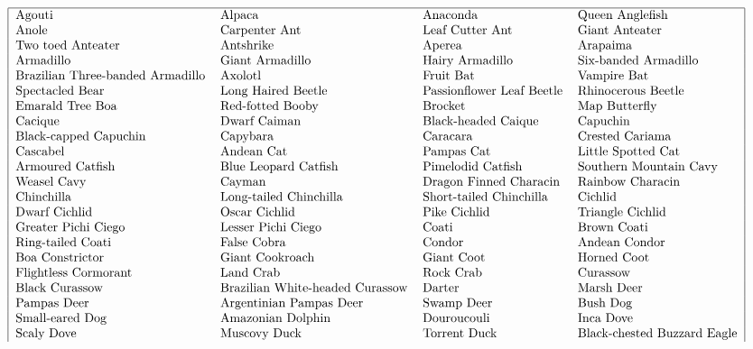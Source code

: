
\tiny
\[\begin{tabular}{|llll|}
\hline
Agouti   & Alpaca   & Anaconda  & Queen Anglefish  \\
Anole   & Carpenter Ant  & Leaf Cutter Ant   & Giant Anteater  \\
Two toed Anteater  & Antshrike   & Aperea   & Arapaima \\
Armadillo   & Giant Armadillo   & Hairy Armadillo  & Six-banded Armadillo  \\
Brazilian Three-banded Armadillo   & Axolotl  & Fruit Bat   & Vampire Bat  \\
Spectacled Bear  & Long Haired Beetle   & Passionflower Leaf Beetle   & Rhinocerous Beetle \\
Emarald Tree Boa   & Red-fotted Booby   & Brocket  & Map Butterfly  \\
Cacique   & Dwarf Caiman  & Black-headed Caique   & Capuchin  \\
Black-capped Capuchin  & Capybara   & Caracara   & Crested Cariama \\
Cascabel   & Andean Cat   & Pampas Cat  & Little Spotted Cat  \\
Armoured Catfish   & Blue Leopard Catfish  & Pimelodid Catfish   & Southern Mountain Cavy  \\
Weasel Cavy  & Cayman   & Dragon Finned Characin   & Rainbow Characin \\
Chinchilla   & Long-tailed Chinchilla   & Short-tailed Chinchilla  & Cichlid  \\
Dwarf Cichlid   & Oscar Cichlid  & Pike Cichlid   & Triangle Cichlid  \\
Greater Pichi Ciego  & Lesser Pichi Ciego   & Coati   & Brown Coati \\
Ring-tailed Coati   & False Cobra   & Condor  & Andean Condor  \\
Boa Constrictor   & Giant Cookroach  & Giant Coot   & Horned Coot  \\
Flightless Cormorant  & Land Crab   & Rock Crab   & Curassow \\
Black Curassow   & Brazilian White-headed Curassow   & Darter  & Marsh Deer  \\
Pampas Deer   & Argentinian Pampas Deer  & Swamp Deer   & Bush Dog  \\
Small-eared Dog  & Amazonian Dolphin   & Douroucouli   & Inca Dove \\
Scaly Dove   & Muscovy Duck   & Torrent Duck  & Black-chested Buzzard Eagle  \\

\end{tabular}\]
